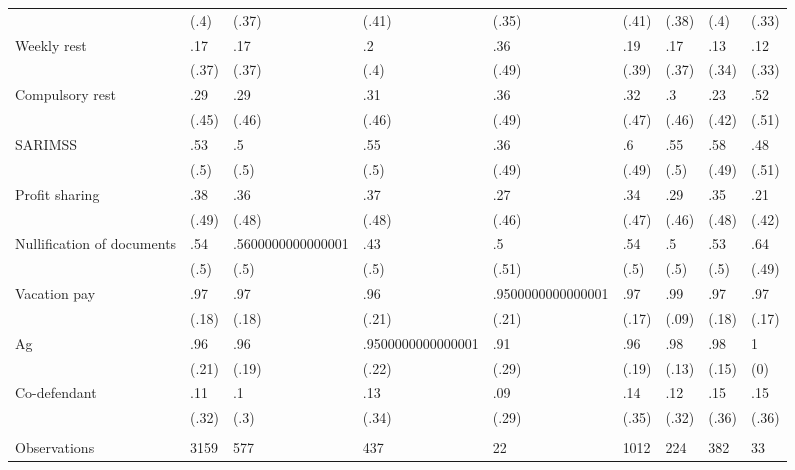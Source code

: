 \begin{tabular}{lllllllll}
      & (.4)  & (.37) & (.41) & (.35) & (.41) & (.38) & (.4)  & (.33) \\
Weekly rest & .17   & .17   & .2    & .36   & .19   & .17   & .13   & .12 \\
      & (.37) & (.37) & (.4)  & (.49) & (.39) & (.37) & (.34) & (.33) \\
Compulsory rest & .29   & .29   & .31   & .36   & .32   & .3    & .23   & .52 \\
      & (.45) & (.46) & (.46) & (.49) & (.47) & (.46) & (.42) & (.51) \\
SARIMSS & .53   & .5    & .55   & .36   & .6    & .55   & .58   & .48 \\
      & (.5)  & (.5)  & (.5)  & (.49) & (.49) & (.5)  & (.49) & (.51) \\
Profit sharing & .38   & .36   & .37   & .27   & .34   & .29   & .35   & .21 \\
      & (.49) & (.48) & (.48) & (.46) & (.47) & (.46) & (.48) & (.42) \\
Nullification of documents & .54   & .5600000000000001 & .43   & .5    & .54   & .5    & .53   & .64 \\
      & (.5)  & (.5)  & (.5)  & (.51) & (.5)  & (.5)  & (.5)  & (.49) \\
Vacation pay & .97   & .97   & .96   & .9500000000000001 & .97   & .99   & .97   & .97 \\
      & (.18) & (.18) & (.21) & (.21) & (.17) & (.09) & (.18) & (.17) \\
Ag    & .96   & .96   & .9500000000000001 & .91   & .96   & .98   & .98   & 1 \\
      & (.21) & (.19) & (.22) & (.29) & (.19) & (.13) & (.15) & (0) \\
Co-defendant & .11   & .1    & .13   & .09   & .14   & .12   & .15   & .15 \\
      & (.32) & (.3)  & (.34) & (.29) & (.35) & (.32) & (.36) & (.36) \\
\midrule
\midrule
      &       &       &       &       &       &       &       &  \\
Observations & 3159  & 577   & 437   & 22    & 1012  & 224   & 382   & 33 \\
\bottomrule
\end{tabular}%
